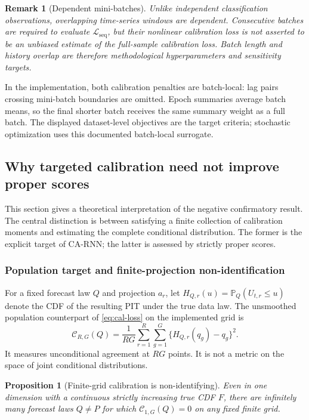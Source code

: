 \documentclass[11pt]{article}
\newtheorem{proposition}[definition]{Proposition}
\newtheorem{remark}[definition]{Remark}
\newcommand{\Pp}{\mathbb{P}}
\begin{document}
\begin{remark}[Dependent mini-batches]
Unlike independent classification observations, overlapping time-series windows
are dependent. Consecutive batches are required to evaluate
$\mathcal L_{\mathrm{seq}}$, but their nonlinear calibration loss is not asserted
to be an unbiased estimate of the full-sample calibration loss. Batch length and
history overlap are therefore methodological hyperparameters and sensitivity
targets.
\end{remark}

In the implementation, both calibration penalties are batch-local: lag pairs
crossing mini-batch boundaries are omitted. Epoch summaries average batch means,
so the final shorter batch receives the same summary weight as a full batch. The
displayed dataset-level objectives are the target criteria; stochastic
optimization uses this documented batch-local surrogate.

\subsection{Why targeted calibration need not improve proper scores}
\label{sec:theory}

This section gives a theoretical interpretation of the negative confirmatory
result. The central distinction is between satisfying a finite collection of
calibration moments and estimating the complete conditional distribution. The
former is the explicit target of CA-RNN; the latter is assessed by strictly
proper scores.

\subsubsection{Population target and finite-projection non-identification}

For a fixed forecast law $Q$ and projection $a_r$, let
$H_{Q,r}(u)=\Pp_Q(U_{t,r}\leq u)$ denote the CDF of the resulting PIT under the
true data law. The unsmoothed population counterpart of
\eqref{eq:cal-loss} on the implemented grid is
\begin{equation}
 \mathcal C_{R,G}(Q)
 =\frac{1}{RG}\sum_{r=1}^R\sum_{g=1}^G
 \{H_{Q,r}(q_g)-q_g\}^2.
 \label{eq:population-grid-calibration}
\end{equation}
It measures unconditional agreement at $RG$ points. It is not a metric on the
space of joint conditional distributions.

\begin{proposition}[Finite-grid calibration is non-identifying]
Even in one dimension with a continuous strictly increasing true CDF $F$, there
are infinitely many forecast laws $Q\neq P$ for which
$\mathcal C_{1,G}(Q)=0$ on any fixed finite grid.
\end{proposition}
\end{document}
